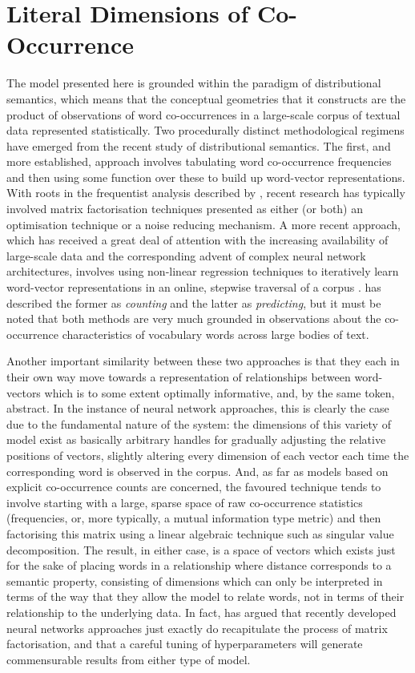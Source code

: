 \section{Literal Dimensions of Co-Occurrence}
The model presented here is grounded within the paradigm of distributional semantics, which means that the conceptual geometries that it constructs are the product of observations of word co-occurrences in a large-scale corpus of textual data represented statistically.  Two procedurally distinct methodological regimens have emerged from the recent study of distributional semantics.  The first, and more established, approach involves tabulating word co-occurrence frequencies and then using some function over these to build up word-vector representations.  With roots in the frequentist analysis described by \cite{SaltonEA1975}, recent research has typically involved matrix factorisation techniques presented as either (or both) an optimisation technique or a noise reducing mechanism.  A more recent approach, which has received a great deal of attention with the increasing availability of large-scale data and the corresponding advent of complex neural network architectures, involves using non-linear regression techniques to iteratively learn word-vector representations in an online, stepwise traversal of a corpus \citep{BengioEA2003,CollobertEA2008,KalchbrennerEA2014}.  \cite{BaroniEA2014} has described the former as \emph{counting} and the latter as \emph{predicting}, but it must be noted that both methods are very much grounded in observations about the co-occurrence characteristics of vocabulary words across large bodies of text.

Another important similarity between these two approaches is that they each in their own way move towards a representation of relationships between word-vectors which is to some extent optimally informative, and, by the same token, abstract.  In the instance of neural network approaches, this is clearly the case due to the fundamental nature of the system: the dimensions of this variety of model exist as basically arbitrary handles for gradually adjusting the relative positions of vectors, slightly altering every dimension of each vector each time the corresponding word is observed in the corpus.  And, as far as models based on explicit co-occurrence counts are concerned, the favoured technique tends to involve starting with a large, sparse space of raw co-occurrence statistics (frequencies, or, more typically, a mutual information type metric) and then factorising this matrix using a linear algebraic technique such as singular value decomposition.  The result, in either case, is a space of vectors which exists just for the sake of placing words in a relationship where distance corresponds to a semantic property, consisting of dimensions which can only be interpreted in terms of the way that they allow the model to relate words, not in terms of their relationship to the underlying data.  In fact, \cite{Levy} has argued that recently developed neural networks approaches just exactly do recapitulate the process of matrix factorisation, and that a careful tuning of hyperparameters will generate commensurable results from either type of model.

